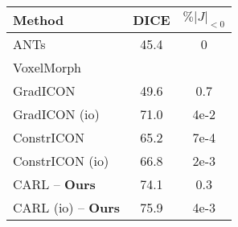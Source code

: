 \iffalse
	\noindent\begin{minipage}{0.4\textwidth}
		\centering
		\begin{small}
			\label{tab:abdomen}
			\begin{tabular}{@{}lcc@{}}
				\toprule
				\textbf{Method}                                & \textbf{DICE} & $\%|J|_{<0}$ \\
				\midrule

				ANTs \cite{avants2008symmetric}                & 45.4          & 0            \\
				VoxelMorph \cite{balakrishnan2019voxelmorph}                                  \\
				GradICON                       \cite{tian2022} & 49.6          & 0.7          \\
				GradICON (io)                                  & 71.0          & 4e-2         \\
				ConstrICON \cite{greer2023inverse}             & 65.2          & 7e-4         \\
				ConstrICON (io)                                & 66.8          & 2e-3         \\
				CARL -- \textbf{Ours}                          & 74.1          & 0.3          \\
				CARL (io) -- \textbf{Ours}                     & 75.9          & 4e-3         \\
				\bottomrule
			\end{tabular}
		\end{small}

	\end{minipage}\hfill
